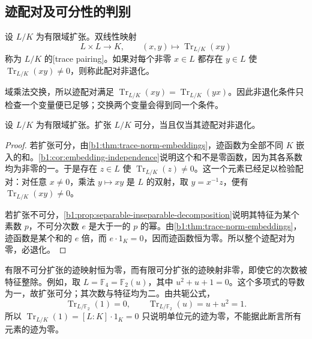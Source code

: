 \subsection{迹配对及可分性的判别}
\label{b1:subsec:1803:02}

\begin{definition}\label{b1:def:trace-pairing}
	设 \(L/K\) 为有限域扩张。双线性映射
	\[
		L\times L\longrightarrow K,\qquad (x,y)\longmapsto\operatorname{Tr}_{L/K}(xy)
	\]
	称为 \(L/K\) 的[trace pairing]。如果对每个非零 \(x\in L\) 都存在 \(y\in L\) 使 \(\operatorname{Tr}_{L/K}(xy)\neq0\)，则称此配对非退化。
\end{definition}
域乘法交换，所以迹配对满足 \(\operatorname{Tr}_{L/K}(xy)=\operatorname{Tr}_{L/K}(yx)\)。因此非退化条件只检查一个变量便已足够；交换两个变量会得到同一个条件。

\begin{theorem}\label{b1:thm:trace-pairing-separable}
	设 \(L/K\) 为有限域扩张。扩张 \(L/K\) 可分，当且仅当其迹配对非退化。
\end{theorem}
\begin{proof}
	若扩张可分，由\cref{b1:thm:trace-norm-embeddings}，迹函数为全部不同 \(K\) 嵌入的和。\cref{b1:cor:embedding-independence}说明这个和不是零函数，因为其各系数均为非零的一。于是存在 \(z\in L\) 使 \(\operatorname{Tr}_{L/K}(z)\ne0\)。这一个元素已经足以检验配对：对任意 \(x\ne0\)，乘法 \(y\mapsto xy\) 是 \(L\) 的双射，取 \(y=x^{-1}z\)，便有 \(\operatorname{Tr}_{L/K}(xy)\ne0\)。

	若扩张不可分，\cref{b1:prop:separable-inseparable-decomposition}说明其特征为某个素数 \(p\)，不可分次数 \(e\) 是大于一的 \(p\) 的幂。由\cref{b1:thm:trace-norm-embeddings}，迹函数是某个和的 \(e\) 倍，而 \(e\cdot1_K=0\)，因而迹函数恒为零。所以整个迹配对为零，必退化。
\end{proof}
有限不可分扩张的迹映射恒为零，而有限可分扩张的迹映射非零，即使它的次数被特征整除。例如，取 \(L=\mathbb F_4=\mathbb F_2(u)\)，其中 \(u^2+u+1=0\)。这个多项式的导数为一，故扩张可分；其次数与特征均为二。由共轭公式，
\[
	\operatorname{Tr}_{L/\mathbb F_2}(1)=0,\qquad \operatorname{Tr}_{L/\mathbb F_2}(u)=u+u^2=1.
\]
所以 \(\operatorname{Tr}_{L/K}(1)=[L:K]\cdot1_K=0\) 只说明单位元的迹为零，不能据此断言所有元素的迹为零。


